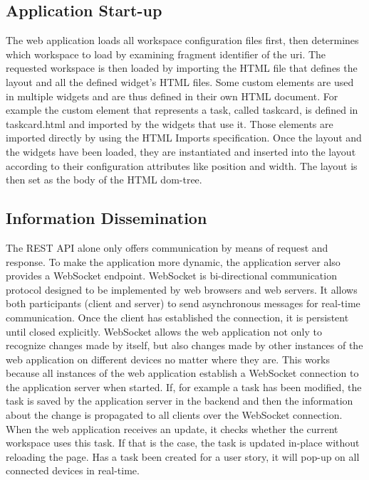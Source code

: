 \documentclass{sigchi}
\begin{document}
\subsection{Application Start-up}
The web application loads all workspace configuration files first, then determines which workspace to load by examining fragment identifier of the \gls{uri}.
The requested workspace is then loaded by importing the HTML file that defines the layout and all the defined widget's HTML files.
Some custom elements are used in multiple widgets and are thus defined in their own HTML document.
For example the custom element that represents a task, called taskcard, is defined in taskcard.html and imported by the widgets that use it.
Those elements are imported directly by using the HTML Imports specification.
Once the layout and the widgets have been loaded, they are instantiated and inserted into the layout according to their configuration attributes like position and width.
The layout is then set as the body of the HTML \gls{dom}-tree.

\subsection{Information Dissemination}
The REST API alone only offers communication by means of request and response.
To make the application more dynamic, the application server also provides a WebSocket \cite{websocketRFC} endpoint.
WebSocket is bi-directional communication protocol designed to be implemented by web browsers and web servers.
It allows both participants (client and server) to send asynchronous messages for real-time communication.
Once the client has established the connection, it is persistent until closed explicitly.
WebSocket allows the web application not only to recognize changes made by itself, but also changes made by other instances of the web application on different devices no matter where they are.
This works because all instances of the web application establish a WebSocket connection to the application server when started.
If, for example a task has been modified, the task is saved by the application server in the backend and then the information about the change is propagated to all clients over the WebSocket connection.
When the web application receives an update, it checks whether the current workspace uses this task.
If that is the case, the task is updated in-place without reloading the page.
Has a task been created for a user story, it will pop-up on all connected devices in real-time.
\end{document}
